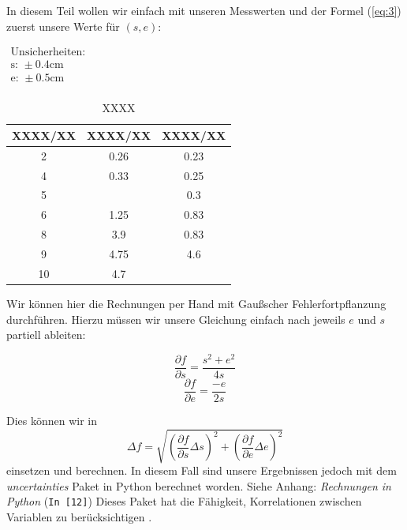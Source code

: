 \documentclass[11pt,a4paper]{article}
\newcommand{\refpy}[1]{Siehe Anhang: \textit{Rechnungen in Python} (\texttt{{\color{incolor}In [{\color{incolor}#1}]}})}
\begin{document}
In diesem Teil wollen wir einfach mit unseren Messwerten und der Formel (\ref{eq:3}) zuerst unsere Werte f\"ur $(s,e)$:

\begin{table}[h]
\centering
\caption{XXXX} \vspace{11pt}
$\begin{array}{l}
\textrm{Unsicherheiten:}\\
\textrm{s: } \pm 0.4 \textrm{cm}\\
\textrm{e: } \pm 0.5 \textrm{cm}\\
\end{array}$
\begin{tabular}{ccc}
\toprule
\textrm{XXXX}/\textrm{XX} & \textrm{XXXX}/\textrm{XX} & \textrm{XXXX}/\textrm{XX} \\
\midrule 
2 & 0.26 & 0.23\\
\hline
4 & 0.33 & 0.25\\
\hline 
5 & & 0.3\\
\hline 
6 & 1.25 & 0.83\\
\hline 
8 & 3.9 & 0.83\\ 
\hline
9 & 4.75 & 4.6\\ 
\hline
10 & 4.7 &\\ 
\bottomrule
\end{tabular}
\label{Tab:X}
\end{table}

Wir k\"onnen hier die Rechnungen per Hand mit Gau\ss scher Fehlerfortpflanzung durchf\"uhren. Hierzu m\"ussen wir unsere Gleichung einfach nach jeweils $e$ und $s$ partiell ableiten:

\[
\frac{\partial f}{\partial s}=\frac{s^2+e^2}{4s}
\]
\[
\frac{\partial f}{\partial e}=\frac{-e}{2s}
\]

Dies k\"onnen wir in
\[
\Delta f=\sqrt{\left(\frac{\partial f}{\partial s}\Delta s\right)^2+\left(\frac{\partial f}{\partial e}\Delta e\right)^2}
\]
einsetzen und berechnen. In diesem Fall sind unsere Ergebnissen jedoch mit dem \textit{uncertainties} Paket in Python berechnet worden. \refpy{12} Dieses Paket hat die F\"ahigkeit, Korrelationen zwischen Variablen zu ber\"ucksichtigen \cite{Uncertainties}.
\end{document}
